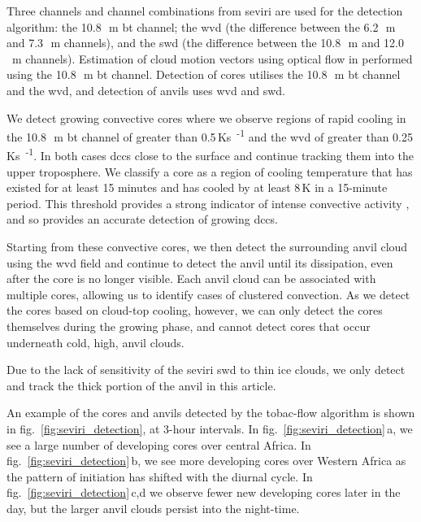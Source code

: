 \documentclass[acp, manuscript]{copernicus}
\begin{document}
Three channels and channel combinations from \acrshort{seviri} are used for the detection algorithm: the 10.8\,\unit{\mu m} \acrshort{bt} channel; the \acrshort{wvd} (the difference between the 6.2\,\unit{\mu m} and 7.3\,\unit{\mu m} channels), and the \acrshort{swd} (the difference between the 10.8\,\unit{\mu m} and 12.0\,\unit{\mu m} channels).
Estimation of cloud motion vectors using optical flow in performed using the 10.8\,\unit{\mu m} \acrshort{bt} channel.
Detection of cores utilises the 10.8\,\unit{\mu m} \acrshort{bt} channel and the \acrshort{wvd}, and detection of anvils uses \acrshort{wvd} and \acrshort{swd}.

We detect growing convective cores where we observe regions of rapid cooling in the 10.8\,\unit{\mu m} \acrshort{bt} channel of greater than 0.5\,\unit{Ks\textsuperscript{-1}} and the \acrshort{wvd} of greater than 0.25\,\unit{Ks\textsuperscript{-1}}.
In both cases
\acrshort{dcc}s close to the surface and continue tracking them into the upper troposphere. 
We classify a core as a region of cooling temperature that has existed for at least 15 minutes and has cooled by at least 8\,\unit{K} in a 15-minute period. 
This threshold provides a strong indicator of intense convective activity \citep{roberts_nowcasting_2003}, and so provides an accurate detection of growing \acrshort{dcc}s.

Starting from these convective cores, we then detect the surrounding anvil cloud using the \acrshort{wvd} field \citep{muller_role_2018, muller_novel_2019} and continue to detect the anvil until its dissipation, even after the core is no longer visible. 
Each anvil cloud can be associated with multiple cores, allowing us to identify cases of clustered convection. 
As we detect the cores based on cloud-top cooling, however, we can only detect the cores themselves during the growing phase, and cannot detect cores that occur underneath cold, high, anvil clouds. 


Due to the lack of sensitivity of the \acrshort{seviri} \acrshort{swd} to thin ice clouds, we only detect and track the thick portion of the anvil in this article.

An example of the cores and anvils detected by the tobac-flow algorithm is shown in fig.~\ref{fig:seviri_detection}, at 3-hour intervals. In fig.~\ref{fig:seviri_detection}\,a, we see a large number of developing cores over central Africa. 
In fig.~\ref{fig:seviri_detection}\,b, we see more developing cores over Western Africa as the pattern of initiation has shifted with the diurnal cycle.
In fig.~\ref{fig:seviri_detection}\,c,d we observe fewer new developing cores later in the day, but the larger anvil clouds persist into the night-time.
\end{document}
